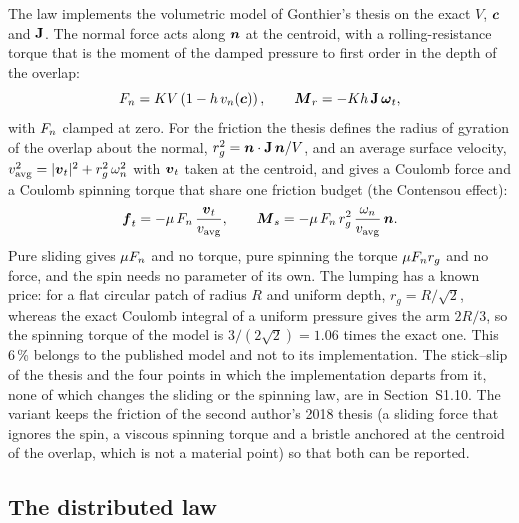 The law  implements the volumetric model of Gonthier's thesis
\cite{Gonthier2007thesis} on the exact $V$, $\boldsymbol{c}$ and $\mathbf{J}$. The normal force acts
along $\boldsymbol{n}$ at the centroid, with a rolling-resistance torque that is the moment of the damped
pressure to first order in the depth of the overlap:
\begin{equation}
  F_n = K V \left(1 - h\,v_n(\boldsymbol{c})\right), \qquad
  \boldsymbol{M}_r = -K h\, \mathbf{J}\, \boldsymbol{\omega}_t ,
  \label{eq:gonthier-normal}
\end{equation}
with $F_n$ clamped at zero. For the friction the thesis defines the radius of gyration of the
overlap about the normal, $r_g^2 = \boldsymbol{n}\cdot\mathbf{J}\,\boldsymbol{n}/V$, and an average surface velocity,
$v_\mathrm{avg}^2 = |\boldsymbol{v}_t|^2 + r_g^2\,\omega_n^2$ with $\boldsymbol{v}_t$ taken at the centroid, and gives
a Coulomb force and a Coulomb spinning torque that share one friction budget (the Contensou
effect):
\begin{equation}
  \boldsymbol{f}_t = -\mu\,F_n\,\frac{\boldsymbol{v}_t}{v_\mathrm{avg}}, \qquad
  \boldsymbol{M}_s = -\mu\,F_n\, r_g^2\,\frac{\omega_n}{v_\mathrm{avg}}\,\boldsymbol{n} .
  \label{eq:gonthier-friction}
\end{equation}
Pure sliding gives $\mu F_n$ and no torque, pure spinning the torque $\mu F_n r_g$ and no force,
and the spin needs no parameter of its own. The lumping has a known price: for a flat circular
patch of radius $R$ and uniform depth, $r_g = R/\sqrt{2}$, whereas the exact Coulomb integral
of a uniform pressure gives the arm $2R/3$, so the spinning torque of the model is
$3/(2\sqrt{2}) = 1.06$ times the exact one. This 6\,\% belongs to the published model and not
to its implementation. The stick--slip of the thesis and the four points in which the
implementation departs from it, none of which changes the sliding or the spinning law, are in
Section~S1.10. The variant  keeps the friction of the second author's 2018
thesis \cite{Vilela2018} (a sliding force that ignores the spin, a viscous spinning torque and
a bristle anchored at the centroid of the overlap, which is not a material point) so that both
can be reported.

\subsection{The distributed law}\label{sec:distributed}

